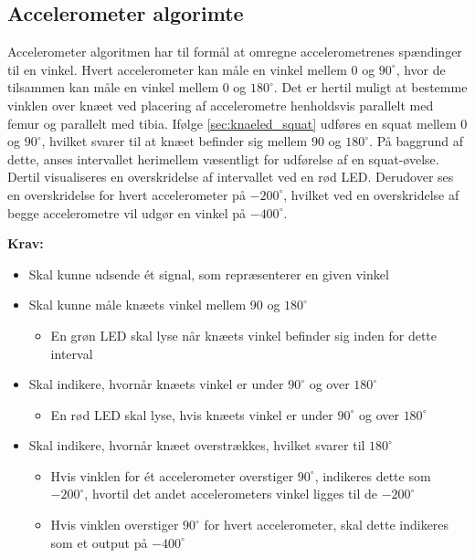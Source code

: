 \subsection{Accelerometer algorimte}
Accelerometer algoritmen har til formål at omregne accelerometrenes spændinger til en vinkel. Hvert accelerometer kan måle en vinkel mellem 0 og $90^{\circ}$, hvor de tilsammen kan måle en vinkel mellem 0 og $180^{\circ}$. Det er hertil muligt at bestemme vinklen over knæet ved placering af accelerometre henholdsvis parallelt med femur og parallelt med tibia. 
Ifølge \autoref{sec:knaeled_squat} udføres en squat mellem $0$ og $90^{\circ}$, hvilket svarer til at knæet befinder sig mellem $90$ og $180^{\circ}$. På baggrund af dette, anses intervallet herimellem væsentligt for udførelse af en squat-øvelse. Dertil visualiseres en overskridelse af intervallet ved en rød LED. Derudover ses en overskridelse for hvert accelerometer på $-200^{\circ}$, hvilket ved en overskridelse af begge accelerometre vil udgør en vinkel på $-400^{\circ}$.
 
\vspace{3mm}
\textbf{Krav:}
\begin{itemize}
\item Skal kunne udsende ét signal, som repræsenterer en given vinkel
\item Skal kunne måle knæets vinkel mellem 90 og $180^{\circ}$
\begin{itemize}
\item En grøn LED skal lyse når knæets vinkel befinder sig inden for dette interval
\end{itemize}
\item Skal indikere, hvornår knæets vinkel er under $90^{\circ}$ og over $180^{\circ}$
\begin{itemize}
\item En rød LED skal lyse, hvis knæets vinkel er under $90^{\circ}$ og over $180^{\circ}$
\end{itemize}
\item Skal indikere, hvornår knæet overstrækkes, hvilket svarer til $180^{\circ}$
\begin{itemize}
\item Hvis vinklen for ét accelerometer overstiger $90^{\circ}$, indikeres dette som $-200^{\circ}$, hvortil det andet accelerometers vinkel ligges til de $-200^{\circ}$
\item Hvis vinklen overstiger $90^{\circ}$ for hvert accelerometer, skal dette indikeres som et output på $-400^{\circ}$
\end{itemize}
\end{itemize}